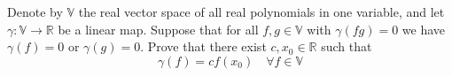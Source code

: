 Denote by $\mathbb{V}$ the real vector space of all real polynomials in one variable, and let $\gamma :\mathbb{V}\to \mathbb{R}$ be a linear map. Suppose that for all $f,g\in \mathbb{V}$ with $\gamma(fg)=0$ we have $\gamma(f)=0$ or $\gamma(g)=0$. Prove that there exist $c,x_0\in \mathbb{R}$ such that
\[ \gamma(f)=cf(x_0)\quad \forall f\in \mathbb{V}\]